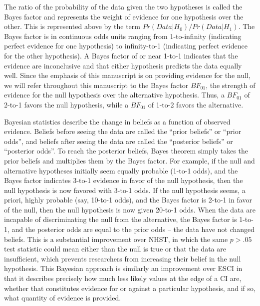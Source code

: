 \documentclass[fignum,nobf,man]{apa}
\begin{document}
The ratio of the probability of the data given the two hypotheses is called the Bayes factor and represents the weight of evidence for one hypothesis over the other. This is represented above by the term %
$Pr(Data | H_0) / Pr(Data | H_1)$. The Bayes factor is in continuous odds units ranging from 1-to-infinity (indicating perfect evidence for one hypothesis) to infinity-to-1 (indicating perfect evidence for the other hypothesis). A Bayes factor of or near 1-to-1 indicates that the evidence are inconclusive and that either hypothesis predicts the data equally well. Since the emphasis of this manuscript is on providing evidence for the null, we will refer throughout this manuscript to the Bayes factor $BF_{01}$, the strength of evidence for the null hypothesis over the alternative hypothesis. Thus, a $BF_{01}$ of 2-to-1 favors the null hypothesis, while a $BF_{01}$ of 1-to-2 favors the alternative.

Bayesian statistics describe the change in beliefs as a function of observed evidence. Beliefs before seeing the data are called the ``prior beliefs'' or ``prior odds'', and beliefs after seeing the data are called the ``posterior beliefs'' or ``posterior odds''. To reach the posterior beliefs, Bayes theorem simply takes the prior beliefs and multiplies them by the Bayes factor. For example, if the null and alternative hypotheses initially seem equally probable (1-to-1 odds), and the Bayes factor indicates 3-to-1 evidence in favor of the null hypothesis, then the null hypothesis is now favored with 3-to-1 odds. If the null hypothesis seems, a priori, highly probable (say, 10-to-1 odds), and the Bayes factor is 2-to-1 in favor of the null, then the null hypothesis is now given 20-to-1 odds. When the data are incapable of discriminating the null from the alternative, the Bayes factor is 1-to-1, and the posterior odds are equal to the prior odds – the data have not changed beliefs. This is a substantial improvement over NHST, in which the same $p > .05$ test statistic could mean either than the null is true or that the data are insufficient, which prevents researchers from increasing their belief in the null hypothesis. This Bayesian approach is similarly an improvement over ESCI in that it describes precisely how much less likely values at the edge of a CI are, whether that constitutes evidence for or against a particular hypothesis, and if so, what quantity of evidence is provided. 
\end{document}

